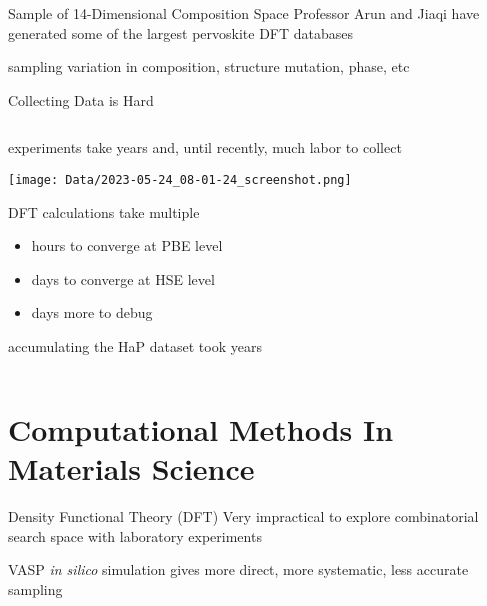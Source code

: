 \documentclass[10pt, aspectratio=169, presentation]{beamer}
\begin{document}
\begin{frame}[label={sec:orge580ea2}]{Sample of 14-Dimensional Composition Space}
Professor Arun and Jiaqi have generated some of the largest pervoskite DFT databases
\autocite{yang-2023-high-throug,pablo-2019-new-front}

sampling variation in composition, structure mutation, phase, etc
\end{frame}
\begin{frame}[label={sec:org55e82ed}]{Collecting Data is Hard}
\begin{columns}
\begin{column}{0.7\columnwidth}
experiments take years and, until recently, much labor to collect
\autocite{almora-2020-devic-perfor}
\begin{center}
\texttt{[image: Data/2023-05-24\_08-01-24\_screenshot.png]}
\end{center}

DFT calculations take multiple
\begin{itemize}
\item hours to converge at PBE level
\item days to converge at HSE level
\item days more to debug
\end{itemize}
accumulating the HaP dataset took years
\autocite{yang-2023-high-throug}
\end{column}
\begin{column}{0.3\columnwidth}
 
\begin{center}

\end{center}
\end{column}
\end{columns}
\end{frame}

\section{Computational Methods In Materials Science}
\label{sec:org7008347}
\begin{frame}[label={sec:org4dd654c}]{Density Functional Theory (DFT)}
Very impractical to explore combinatorial search space with laboratory experiments

VASP \emph{in silico} simulation gives more direct, more systematic, less accurate sampling
\autocite{kresse-1996-effic-iterat,kresse-1996-effic-ab}
\end{frame}
\end{document}
